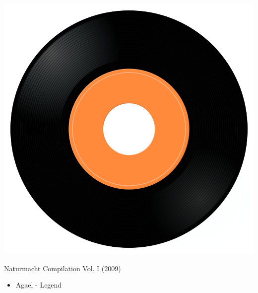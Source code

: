 \begin{minipage}[t]{0.25\textwidth}\vspace{0pt}
\captionsetup{type=figure}
\includegraphics[width=\textwidth]{Images/cover.png}
\caption*{Naturmacht Compilation Vol. I (2009)}
\end{minipage}
\begin{minipage}[t]{0.25\textwidth}\vspace{0pt}
\begin{itemize}[nosep,leftmargin=1em,labelwidth=*,align=left]
	\setlength{\itemsep}{0pt}
	\item Agael - Legend
\end{itemize}
\end{minipage}
